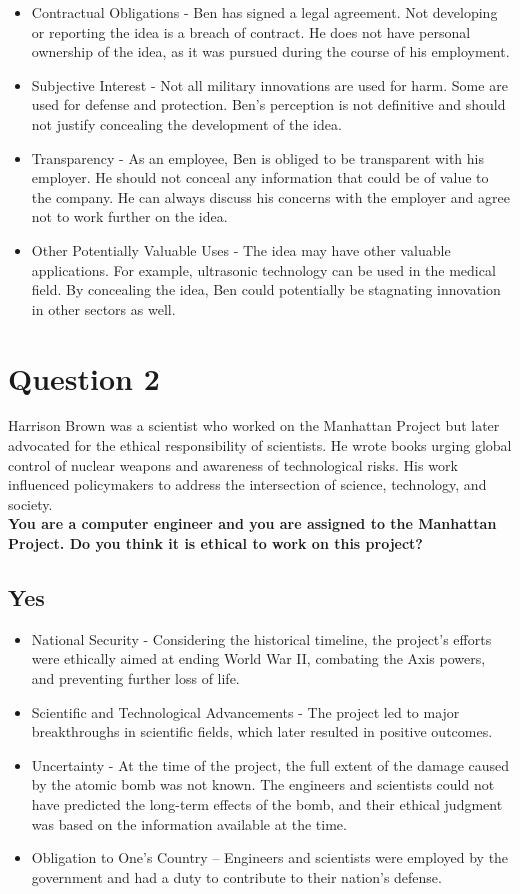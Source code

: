 \documentclass{article}
\begin{document}
\begin{itemize}
    \item Contractual Obligations - Ben has signed a legal agreement. Not developing or reporting the idea is a breach of contract. He does not have personal ownership of the idea, as it was pursued during the course of his employment.
    \item Subjective Interest - Not all military innovations are used for harm. Some are used for defense and protection. Ben’s perception is not definitive and should not justify concealing the development of the idea.
    \item Transparency - As an employee, Ben is obliged to be transparent with his employer. He should not conceal any information that could be of value to the company. He can always discuss his concerns with the employer and agree not to work further on the idea.
    \item Other Potentially Valuable Uses - The idea may have other valuable applications. For example, ultrasonic technology can be used in the medical field. By concealing the idea, Ben could potentially be stagnating innovation in other sectors as well.
\end{itemize}

\section{Question 2}
Harrison Brown was a scientist who worked on the Manhattan Project but later advocated for the ethical responsibility of scientists. He wrote books urging global control of nuclear weapons and awareness of technological risks. His work influenced policymakers to address the intersection of science, technology, and society.\\

\textbf{You are a computer engineer and you are assigned to the Manhattan Project. Do you think it is ethical to work on this project?}

\subsection{Yes}
\begin{itemize}
    \item National Security - Considering the historical timeline, the project’s efforts were ethically aimed at ending World War II, combating the Axis powers, and preventing further loss of life.
    \item Scientific and Technological Advancements - The project led to major breakthroughs in scientific fields, which later resulted in positive outcomes.
    \item Uncertainty - At the time of the project, the full extent of the damage caused by the atomic bomb was not known. The engineers and scientists could not have predicted the long-term effects of the bomb, and their ethical judgment was based on the information available at the time.
    \item Obligation to One’s Country – Engineers and scientists were employed by the government and had a duty to contribute to their nation’s defense.
\end{itemize}
\end{document}
